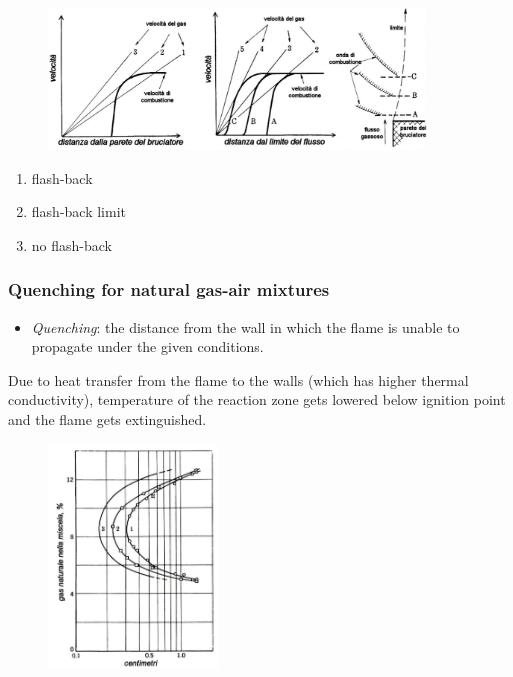 \documentclass[12pt]{article}
\begin{document}
\begin{figure}[!ht]
\centering
\includegraphics[width=0.9\textwidth]{figures/flash.png}
\end{figure}

\begin{enumerate}
    \item flash-back
    \item flash-back limit
    \item no flash-back
\end{enumerate}

\subsubsection{Quenching for natural gas-air mixtures}

\begin{itemize}
    \item \textit{Quenching}: the distance from the wall in which the flame is unable to propagate under the given conditions.
\end{itemize}
Due to heat transfer from the flame to the walls (which has higher thermal conductivity), temperature of the reaction zone gets lowered below ignition point and the flame gets extinguished.

\begin{figure}[!ht]
\centering
\includegraphics[width=0.4\textwidth]{figures/quenching.png}
\end{figure}
\end{document}
